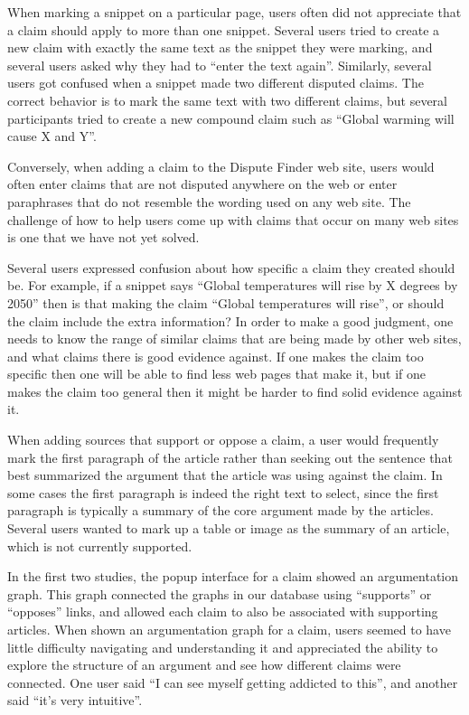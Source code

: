 \documentclass{www2010-submission}
\begin{document}
When marking a snippet on a particular page, users often did not appreciate that a claim should apply to more than one snippet. Several users tried to create a new claim with exactly the same text as the snippet they were marking, and several users asked why they had to ``enter the text again''. Similarly, several users got confused when a snippet made two different disputed claims. The correct behavior is to mark the same text with two different claims, but several participants tried to create a new compound claim such as ``Global warming will cause X and Y''. 

Conversely, when adding a claim to the Dispute Finder web site, users would often enter claims that are not disputed anywhere on the web or enter paraphrases that do not resemble the wording used on any web site. The challenge of how to help users come up with claims that occur on many web sites is one that we have not yet solved.

Several users expressed confusion about how specific a claim they created should be. For example, if a snippet says ``Global temperatures will rise by X degrees by 2050'' then is that making the claim ``Global temperatures will rise'', or should the claim include the extra information? In order to make a good judgment, one needs to know the range of similar claims that are being made by other web sites, and what claims there is good evidence against. If one makes the claim too specific then one will be able to find less web pages that make it, but if one makes the claim too general then it might be harder to find solid evidence against it.

When adding sources that support or oppose a claim, a user would frequently mark the first paragraph of the article rather than seeking out the sentence that best summarized the argument that the article was using against the claim. In some cases the first paragraph is indeed the right text to select, since the first paragraph is typically a summary of the core argument made by the articles. Several users wanted to mark up a table or image as the summary of an article, which is not currently supported.

In the first two studies, the popup interface for a claim showed an argumentation graph. This graph connected the graphs in our database using ``supports'' or ``opposes'' links, and allowed each claim to also be associated with supporting articles. When shown an argumentation graph for a claim, users seemed to have little difficulty navigating and understanding it and appreciated the ability to explore the structure of an argument and see how different claims were connected. One user said ``I can see myself getting addicted to this'', and another said ``it's very intuitive''.
\end{document}
